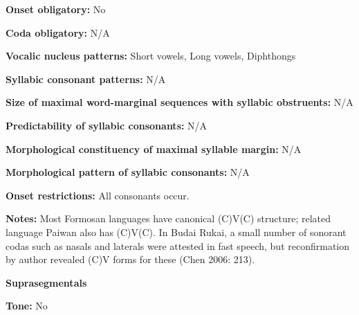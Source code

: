 \begin{styleBody}
\textbf{Onset obligatory:} No
\end{styleBody}

\begin{styleBody}
\textbf{Coda obligatory:} N/A
\end{styleBody}

\begin{styleBody}
\textbf{Vocalic nucleus patterns:} Short vowels, Long vowels, Diphthongs
\end{styleBody}

\begin{styleBody}
\textbf{Syllabic consonant patterns:} N/A
\end{styleBody}

\begin{styleBody}
\textbf{Size of maximal word{}-marginal sequences with syllabic obstruents:} N/A
\end{styleBody}

\begin{styleBody}
\textbf{Predictability of syllabic consonants:} N/A
\end{styleBody}

\begin{styleBody}
\textbf{Morphological constituency of maximal syllable margin:} N/A
\end{styleBody}

\begin{styleBody}
\textbf{Morphological pattern of syllabic consonants:} N/A
\end{styleBody}

\begin{styleBody}
\textbf{Onset restrictions: }All consonants occur.
\end{styleBody}

\begin{styleBody}
\textbf{Notes: }Most Formosan languages have canonical (C)V(C) structure; related language Paiwan also has (C)V(C). In Budai Rukai, a small number of sonorant codas such as nasals and laterals were attested in fast speech, but reconfirmation by author revealed (C)V forms for these (Chen 2006: 213).
\end{styleBody}

\begin{styleBody}
\textbf{Suprasegmentals}
\end{styleBody}

\begin{styleBody}
\textbf{Tone:} No
\end{styleBody}

